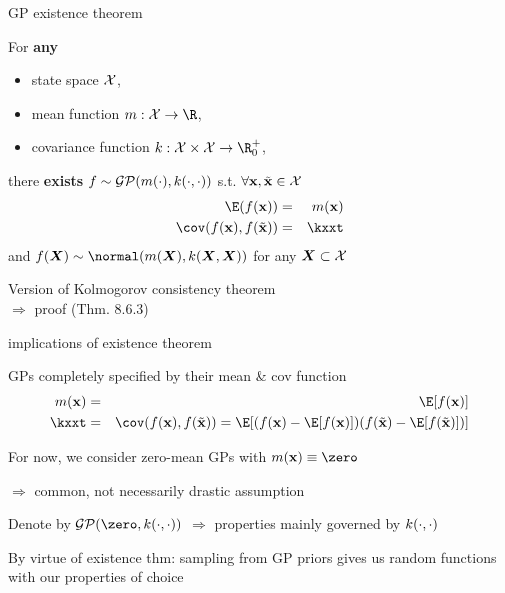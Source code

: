 \documentclass[11pt,compress,t,notes=noshow, xcolor=table]{beamer}
\begin{document}

\begin{framei}[sep=L]{GP existence theorem}
\item For \textbf{any} 
\begin{itemize}
\item state space $\mathcal{X}$,
\item mean function $m: \Xspace \rightarrow \R$,
\item covariance function $k: \Xspace \times \Xspace \rightarrow \R^+_0$, 
\end{itemize}
\vfill
there \textbf{exists} $f \sim \mathcal{GP}(m(\cdot), k(\cdot, \cdot))$ s.t. $\forall \mathbf{x}, \tilde{\mathbf{x}} \in \mathcal{X}$
\begin{eqnarray*}
\E(\fx) &=& m(\xv) \\
\cov(\fx, f(\xtil)) &=& \kxxt
\end{eqnarray*}
and $f(\bm{X}) \sim \normal(m(\bm{X}), k(\bm{X}, \bm{X}))$ for any $\bm{X} \subset \mathcal{X}$
\item Version of Kolmogorov consistency theorem \\$\Rightarrow$ proof  (Thm. 8.6.3)
\end{framei}

\begin{framei}[sep=L]{implications of existence theorem}
\item GPs completely specified by their mean \& cov function
\begin{eqnarray*}
m(\xv) &=& \E[f(\xv)] \\
\kxxt &=& \cov(\fx, f(\xtil)) = \E [( f(\xv) - \E[f(\xv)]) ( f(\xtil) - \E[f(\xtil)] )]
\end{eqnarray*}
\item For now, we consider zero-mean GPs with $m(\xv) \equiv \zero$ 

$\Rightarrow$ common, not necessarily drastic assumption 
\item Denote by $\GPzk$ $\Rightarrow$ properties mainly governed by $k(\cdot, \cdot)$
\item By virtue of existence thm: sampling from GP priors gives us random functions with our properties of choice
\end{framei}
\end{document}

